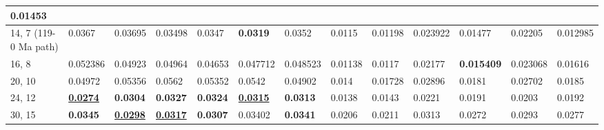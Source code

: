 \begin{table*}
{\begin{tabular}{|l|l|l|l|l|l|l|l|l|l|l|l|l|}
  0.01453 \\ \hline
14, 7 (119-0 Ma path) & 0.0367 & 0.03695 & 0.03498 & 0.0347 &
  {\color[HTML]{32CB00} \textbf{0.0319}} & 0.0352 & 0.0115 & 0.01198 & 0.023922
  & 0.01477 & 0.02205 & 0.012985 \\ \hline
16, 8 & 0.052386 & 0.04923 & 0.04964 & 0.04653 & 0.047712 & 0.048523 & 0.01138
  & 0.0117 & 0.02177 & {\color[HTML]{32CB00} \textbf{0.015409}} & 0.023068 &
  0.01616 \\ \hline
20, 10 & 0.04972 & 0.05356 & 0.0562 & 0.05352 & 0.0542 & 0.04902 & 0.014 &
  0.01728 & 0.02896 & 0.0181 & 0.02702 & 0.0185 \\ \hline
24, 12 & {\color[HTML]{009901} {\ul \textbf{0.0274}}} & {\color[HTML]{32CB00} \textbf{0.0304}} & {\color[HTML]{34FF34} \textbf{0.0327}} & {\color[HTML]{34FF34} \textbf{0.0324}} & {\color[HTML]{009901} {\ul \textbf{0.0315}}} & {\color[HTML]{34FF34} \textbf{0.0313}} & 0.0138 & 0.0143 & 0.0221 & 0.0191 & 0.0203 & 0.0192 \\ \hline
30, 15 & {\color[HTML]{34FF34} \textbf{0.0345}} & {\color[HTML]{009901} {\ul
  \textbf{0.0298}}} & {\color[HTML]{009901} {\ul \textbf{0.0317}}} &
  {\color[HTML]{32CB00} \textbf{0.0307}} & 0.03402 & {\color[HTML]{32CB00}
  \textbf{0.0341}} & 0.0206 & 0.0211 & 0.0313 & 0.0272 & 0.0293 & 0.0277 \\ \hline
\end{tabular}%
}
\end{table*}
